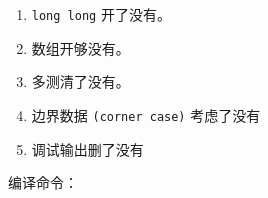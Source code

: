 \begin{enumerate}
    \item \verb|long long| 开了没有。
    \item 数组开够没有。
    \item 多测清了没有。
    \item 边界数据 \verb|(corner case)| 考虑了没有
    \item 调试输出删了没有
\end{enumerate}
编译命令：
\inputminted{bash}{src/tools/compile.sh}